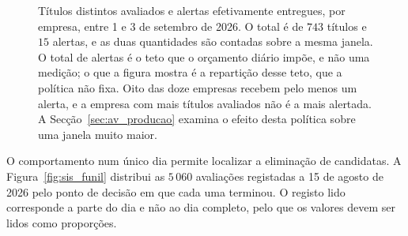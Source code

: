 \begin{figure}[ht]
\caption[Seletividade do sistema por empresa]{Títulos distintos avaliados e alertas
efetivamente entregues, por empresa, entre 1 e 3 de setembro de 2026. O total é de $743$ títulos e
$15$ alertas, e as duas quantidades são contadas sobre a mesma janela. O total de alertas é o teto
que o orçamento diário impõe, e não uma medição; o que a figura mostra é a repartição desse teto,
que a política não fixa. Oito das doze empresas recebem pelo menos um alerta, e a empresa com mais
títulos avaliados não é a mais alertada. A Secção~\ref{sec:av_producao} examina o efeito desta
política sobre uma janela muito maior.}
\label{fig:sis_seletividade}
\end{figure}


O comportamento num único dia permite localizar a eliminação de candidatas. A
Figura~\ref{fig:sis_funil} distribui as $5\,060$ avaliações registadas a 15 de agosto de 2026 pelo
ponto de decisão em que cada uma terminou. O registo lido corresponde a parte do dia e não ao dia
completo, pelo que os valores devem ser lidos como proporções.

